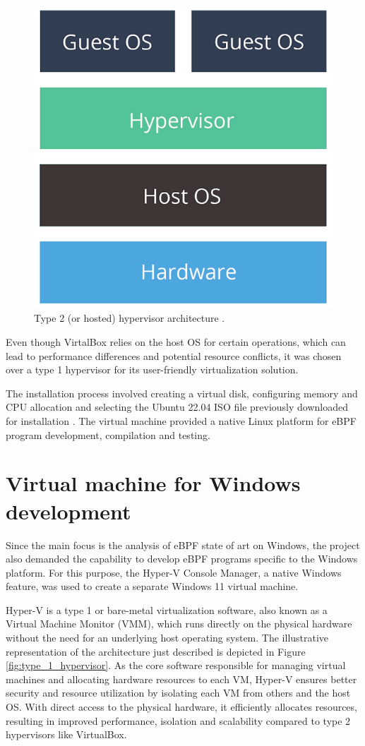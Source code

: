 \begin{figure}[h]
	\centering
	\includegraphics[width=0.7\linewidth]{images/Technologies/type_2_hypervisor.png}
	\caption{Type 2 (or hosted) hypervisor architecture \cite{HypervisorsArchitectures}.}
	\label{fig:type_2_hypervisor}
\end{figure}

Even though VirtalBox relies on the host OS for certain operations, which can lead to performance differences and potential resource conflicts, it was chosen over a type 1 hypervisor for its user-friendly virtualization solution.

The installation process involved creating a virtual disk, configuring memory and CPU allocation and selecting the Ubuntu 22.04 ISO file previously downloaded for installation \cite{UbuntuISOImage}. 
The virtual machine provided a native Linux platform for eBPF program development, compilation and testing.


\section{Virtual machine for Windows development}

Since the main focus is the analysis of eBPF state of art on Windows, the project also demanded the capability to develop eBPF programs specific to the Windows platform. 
For this purpose, the Hyper-V Console Manager, a native Windows feature, was used to create a separate Windows 11 virtual machine.

Hyper-V is a type 1 or bare-metal virtualization software, also known as a Virtual Machine Monitor (VMM), which runs directly on the physical hardware without the need for an underlying host operating system. 
The illustrative representation of the architecture just described is depicted in Figure \ref{fig:type_1_hypervisor}.
As the core software responsible for managing virtual machines and allocating hardware resources to each VM, Hyper-V ensures better security and resource utilization by isolating each VM from others and the host OS. 
With direct access to the physical hardware, it efficiently allocates resources, resulting in improved performance, isolation and scalability compared to type 2 hypervisors like VirtualBox.

